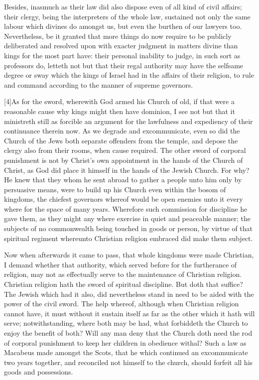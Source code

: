 Besides, inasmuch as their law did also dispose even of all kind of civil affairs; their clergy, being the interpreters of the whole law, sustained not only the same labour which divines do amongst us, but even the burthen of our lawyers too. Nevertheless, be it granted that more things do now require to be publicly deliberated and resolved upon with exacter judgment in matters divine than kings for the most part have: their personal inability to judge, in such sort as professors do, letteth not but that their regal authority may have the selfsame degree or sway which the kings of Israel had in the affairs of their religion, to rule and command according to the manner of supreme governors.

[4]As for the sword, wherewith God armed his Church of old, if that were a reasonable cause why kings might then have dominion, I see not but that it ministreth still as forcible an argument for the lawfulness and expediency of their continuance therein now. As we degrade and excommunicate, even so did the Church of the Jews both separate offenders from the temple, and depose the clergy also from their rooms, when cause required. The other sword of corporal punishment is not by Christ’s own appointment in the hands of the Church of Christ, as God did place it himself in the hands of the Jewish Church. For why? He knew that they whom  he sent abroad to gather a people unto him only by persuasive means, were to build up his Church even within the bosom of kingdoms, the chiefest governors whereof would be open enemies unto it every where for the space of many years. Wherefore such commission for discipline he gave them, as they might any where exercise in quiet and peaceable manner; the subjects of no commonwealth being touched in goods or person, by virtue of that spiritual regiment whereunto Christian religion embraced did make them subject.

Now when afterwards it came to pass, that whole kingdoms were made Christian, I demand whether that authority, which served before for the furtherance of religion, may not as effectually serve to the maintenance of Christian religion. Christian religion hath the sword of spiritual discipline. But doth that suffice? The Jewish which had it also, did nevertheless stand in need to be aided with the power of the civil sword. The help whereof, although when Christian religion cannot have, it must without it sustain itself as far as the other which it hath will serve; notwithstanding, where both may be had, what forbiddeth the Church to enjoy the benefit of both? Will any man deny that the Church doth need the rod of corporal punishment to keep her children in obedience withal? Such a law as Macabeus made amongst the Scots, that he which continued an excommunicate two years together, and reconciled not himself to the church, should forfeit all his goods and possessions.

